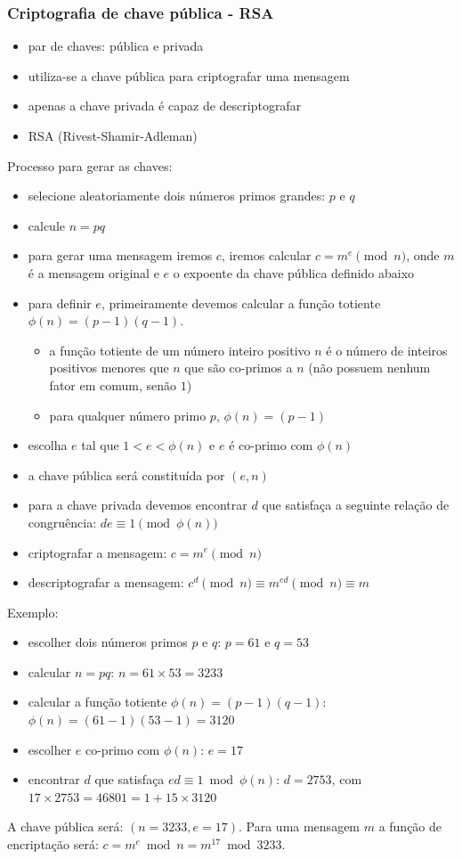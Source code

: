 \begin{frame}
\frametitle{Criptografia de chave pública - RSA}
\begin{itemize}
\item par de chaves: pública e privada
\item utiliza-se a chave pública para criptografar uma mensagem
\item apenas a chave privada é capaz de descriptografar
\item RSA (Rivest-Shamir-Adleman) 
\end{itemize}

\framebreak

Processo para gerar as chaves:
\begin{itemize}
\item selecione aleatoriamente dois números primos grandes: $p$ e $q$
\item calcule $n = pq$
\item para gerar uma mensagem iremos $c$, iremos calcular $c = m^e \pmod{n}$, onde
$m$ é a mensagem original e $e$ o expoente da chave pública definido abaixo
\item para definir $e$, primeiramente devemos calcular a função totiente $\phi(n) = (p-1)(q-1)$.
     \begin{itemize}
     \item a função totiente de um número inteiro positivo $n$ é o número de inteiros positivos menores que $n$ que são co-primos a $n$ 
     (não possuem nenhum fator em comum, senão $1$)
     \item para qualquer número primo $p$, $\phi(n) = (p-1)$ 
     \end{itemize}
\item escolha $e$ tal que $1 < e < \phi(n)$ e $e$ é co-primo com $\phi(n)$
\item a chave pública será constituída por $(e,n)$
\item para a chave privada devemos encontrar $d$ que satisfaça a seguinte relação de congruência: $de \equiv 1 \pmod{\phi(n)}$
\item criptografar a mensagem: $c = m^e \pmod{n}$
\item descriptografar a mensagem: $c^d \pmod n \equiv m^{ed} \pmod n \equiv m$
\end{itemize}

\framebreak

Exemplo:
\begin{itemize}
\item escolher dois números primos $p$ e $q$: $p=61$ e $q=53$
\item calcular $n = pq$: $n = 61 \times 53 = 3233$
\item calcular a função totiente $\phi(n) = (p-1)(q-1)$: $\phi(n) = (61 - 1)(53 - 1) = 3120$
\item escolher $e$ co-primo com $\phi(n)$: $e = 17$
\item encontrar $d$ que satisfaça $e d \equiv 1 \bmod{\phi(n)}$: $d=2753$, com $17 \times 2753 = 46801 = 1 + 15 \times 3120$
\end{itemize}
A chave pública será: $(n=3233, e=17)$. Para uma mensagem $m$ a função de encriptação será: $c = m^e \bmod{n} = m^{17} \bmod 3233$.


\end{frame}
